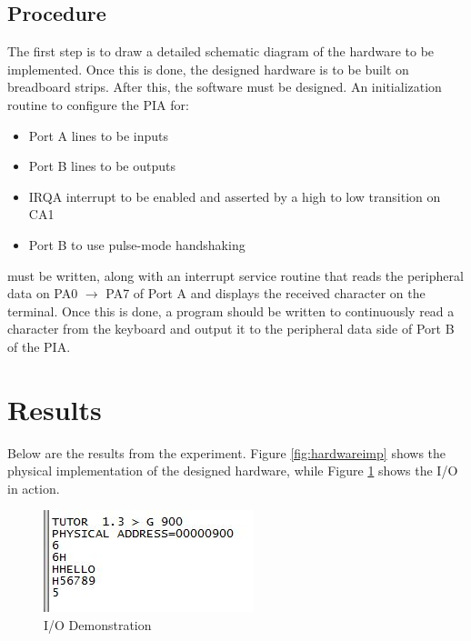 \documentclass[12pt,Letter]{article}
\begin{document}
\subsection{Procedure}
The first step is to draw a detailed schematic diagram of the hardware to be implemented. Once this is done, the designed hardware is to be built on breadboard strips. After this, the software must be designed. An initialization routine to configure the PIA for:
	\begin{itemize}
		\item Port A lines to be inputs
		\item Port B lines to be outputs
		\item IRQA interrupt to be enabled and asserted by a high to low transition on CA1
		\item Port B to use pulse-mode handshaking
	\end{itemize}
must be written, along with an interrupt service routine that reads the peripheral data on PA0 $\to$ PA7 of Port A and displays the received character on the terminal. Once this is done, a program should be written to continuously read a character from the keyboard and output it to the peripheral data side of Port B of the PIA.
\section{Results}
Below are the results from the experiment. Figure \ref{fig:hardwareimp} shows the physical implementation of the designed hardware, while Figure \ref{fig:output} shows the I/O in action.
\begin{figure}[H]
\centering
\includegraphics[width=.5\linewidth]{output}
\caption{I/O Demonstration}
\label{fig:output}
\end{figure}
\end{document}

